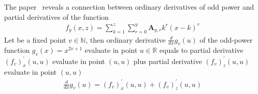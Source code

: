 The paper~\cite{another_approach_to_get_derivative_of_odd_power} reveals a connection between
ordinary derivatives of odd power and partial derivatives of the function
\begin{align*}
    f_{y} (x, z) = \sum_{k=1}^{z} \sum_{r=0}^{y} \mathbf{A}_{y,r} k^r (x-k)^r
\end{align*}
Let be a fixed point $v\in \mathbb{N}$, then ordinary derivative $\frac{d}{dx} g_v (u)$ of the odd-power function $g_v(x) = x^{2v + 1}$
evaluate in point $u\in\mathbb{R}$ equals to partial derivative $(f_{v})^{'}_{x} (u, u)$ evaluate in point $(u, u)$ plus
partial derivative $(f_{v})^{'}_{z} (u, u)$ evaluate in point $(u, u)$
\begin{align*}
    \frac{d}{dx} g_v (u) = (f_{v})^{'}_{x} (u, u) + (f_{v})^{'}_{z} (u, u)
\end{align*}

